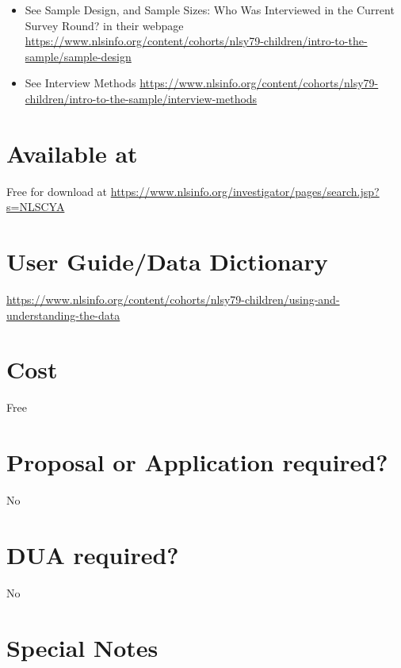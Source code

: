 \documentclass[
]{book}
\providecommand{\tightlist}{%
  \setlength{\itemsep}{0pt}\setlength{\parskip}{0pt}}
\begin{document}
\begin{itemize}
\tightlist
\item
  See Sample Design, and Sample Sizes: Who Was Interviewed in the Current Survey Round? in their webpage \url{https://www.nlsinfo.org/content/cohorts/nlsy79-children/intro-to-the-sample/sample-design}
\item
  See Interview Methods
  \url{https://www.nlsinfo.org/content/cohorts/nlsy79-children/intro-to-the-sample/interview-methods}
\end{itemize}

\hypertarget{available-at-58}{%
\section{Available at}\label{available-at-58}}

Free for download at \url{https://www.nlsinfo.org/investigator/pages/search.jsp?s=NLSCYA}

\hypertarget{user-guidedata-dictionary-58}{%
\section{User Guide/Data Dictionary}\label{user-guidedata-dictionary-58}}

\url{https://www.nlsinfo.org/content/cohorts/nlsy79-children/using-and-understanding-the-data}

\hypertarget{cost-58}{%
\section{Cost}\label{cost-58}}

Free

\hypertarget{proposal-or-application-required-58}{%
\section{Proposal or Application required?}\label{proposal-or-application-required-58}}

No

\hypertarget{dua-required-58}{%
\section{DUA required?}\label{dua-required-58}}

No

\hypertarget{special-notes-58}{%
\section{Special Notes}\label{special-notes-58}}
\end{document}

